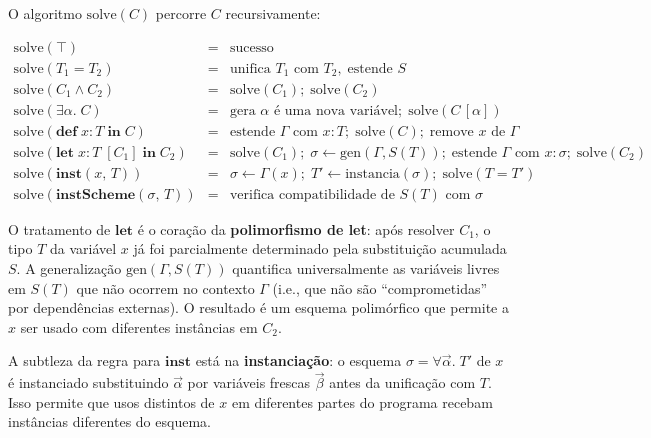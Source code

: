   O algoritmo \(\mathrm{solve}(C)\) percorre \(C\) recursivamente:

  \[
    \begin{array}{rcl} \mathrm{solve}(\top) & = & \text{sucesso} \\
      \mathrm{solve}(T_1 = T_2) & = & \text{unifica } T_1 \text{ com } T_2,\;
      \text{estende } S \\ \mathrm{solve}(C_1 \wedge C_2) & = &
      \mathrm{solve}(C_1);\; \mathrm{solve}(C_2) \\ \mathrm{solve}(\exists
      \alpha.\; C) & = & \text{gera } \alpha \text{ é uma nova variável};\;
      \mathrm{solve}(C\,[\alpha]) \\ \mathrm{solve}(\mathbf{def}\; x : T\;
      \mathbf{in}\; C) & = & \text{estende } \Gamma \text{ com } x : T;\;
      \mathrm{solve}(C);\; \text{remove } x \text{ de } \Gamma \\
      \mathrm{solve}(\mathbf{let}\; x : T\; [C_1]\; \mathbf{in}\; C_2) & = &
      \mathrm{solve}(C_1);\; \sigma \leftarrow \mathrm{gen}(\Gamma, S(T));\;
      \text{estende } \Gamma \text{ com } x : \sigma;\; \mathrm{solve}(C_2) \\
      \mathrm{solve}(\mathbf{inst}(x,\, T)) & = & \sigma \leftarrow
      \Gamma(x);\; T'
      \leftarrow \mathrm{instancia}(\sigma);\; \mathrm{solve}(T = T') \\
      \mathrm{solve}(\mathbf{instScheme}(\sigma,\, T)) & = & \text{verifica
      compatibilidade de } S(T) \text{ com } \sigma
  \end{array} \]

  O tratamento de \(\mathbf{let}\) é o coração da \textbf{polimorfismo
  de let}: após resolver \(C_1\), o tipo \(T\) da variável \(x\) já foi
  parcialmente determinado pela substituição acumulada \(S\). A
  generalização \(\mathrm{gen}(\Gamma, S(T))\) quantifica
  universalmente as variáveis livres em \(S(T)\) que não ocorrem no
  contexto \(\Gamma\) (i.e., que não são ``comprometidas'' por
  dependências externas). O resultado é um esquema polimórfico que
  permite a \(x\) ser usado com diferentes instâncias em \(C_2\).

  A subtleza da regra para \(\mathbf{inst}\) está na
  \textbf{instanciação}: o esquema \(\sigma = \forall \vec{\alpha}.\;
  T'\) de \(x\) é instanciado substituindo \(\vec{\alpha}\) por
  variáveis frescas \(\vec{\beta}\) antes da unificação com \(T\). Isso
  permite que usos distintos de \(x\) em diferentes partes do programa
  recebam instâncias diferentes do esquema.

